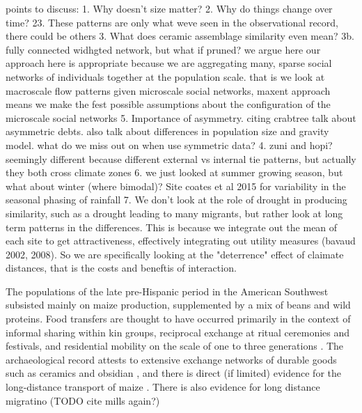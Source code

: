 \documentclass[fleqn,10pt]{wlscirep}
\begin{document}
points to discuss:
1. Why doesn't size matter?
2. Why do things change over time?
23. These patterns are only what weve seen in the observational record, there could be others
3. What does ceramic assemblage similarity even mean?
3b. fully connected widhgted network, but what if pruned?
  we argue here our approach here is appropriate because we are aggregating many, sparse social networks of individuals together at the population scale. that is we look at macroscale flow patterns given microscale social networks, maxent approach means we make the fest possible assumptions about the configuration of the microscale social networks
5. Importance of asymmetry. citing crabtree talk about asymmetric debts. also talk about differences in population size and gravity model. what do we miss out on when use symmetric data?
4. zuni and hopi? seemingly different because different external vs internal tie patterns, but actually they both cross climate zones
6. we just looked at summer growing season, but what about winter (where bimodal)? Site coates et al 2015 for variability in the seasonal phasing of rainfall
7. We don't look at the role of drought in producing similarity, such as a drought leading to many migrants, but rather look at long term patterns in the differences. This is because we integrate out the mean of each site to get attractiveness, effectively integrating out utility measures (bavaud 2002, 2008). So we are specifically looking at the "deterrence" effect of claimate distances, that is the costs and beneftis of interaction.

The populations of the late pre-Hispanic period in the American Southwest subsisted mainly on maize production, supplemented by a mix of beans and wild proteins. Food transfers are thought to have occurred primarily in the context of informal sharing within kin groups, reciprocal exchange at ritual ceremonies and festivals, and residential mobility on the scale of one to three generations \cite{Hegmon1991,Hegmon1996,Kohler1996TheAnasazi,Varien1999SedentismBeyond,Cordell2007MesaMigration}. The archaeological record attests to extensive exchange networks of durable goods such as ceramics and obsidian \cite{Mills2013a}, and there is direct (if limited) evidence for the long-distance transport of maize \cite{Benson2009PossibleMexico,Benson2010WhoDrought}. There is also evidence for long distance migratino (TODO cite mills again?)
\end{document}
